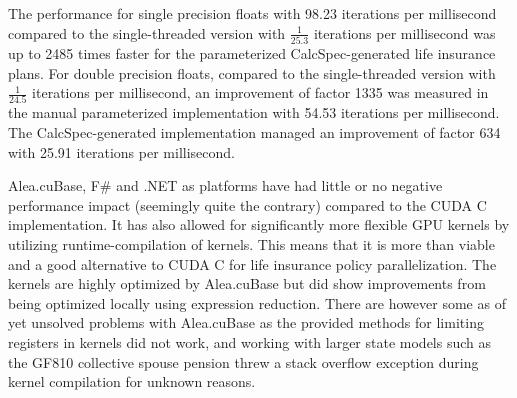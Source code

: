 The performance for single precision floats with 98.23 iterations per millisecond compared to the single-threaded version with $\frac{1}{25.3}$ iterations per millisecond was up to 2485 times faster for the parameterized CalcSpec-generated life insurance plans.
For double precision floats, compared to the single-threaded version with $\frac{1}{24.5}$ iterations per millisecond, an improvement of factor 1335 was measured in the manual parameterized implementation with 54.53 iterations per millisecond. 
The CalcSpec-generated implementation managed an improvement of factor 634 with 25.91 iterations per millisecond.

Alea.cuBase, F\# and .NET as platforms have had little or no negative performance impact (seemingly quite the contrary) compared to the CUDA C implementation.
It has also allowed for significantly more flexible GPU kernels by utilizing runtime-compilation of kernels.
This means that it is more than viable and a good alternative to CUDA C for life insurance policy parallelization.
The kernels are highly optimized by Alea.cuBase but did show improvements from being optimized locally using expression reduction.
There are however some as of yet unsolved problems with Alea.cuBase as the provided methods for limiting registers in kernels did not work, and working with larger state models such as the GF810 collective spouse pension threw a stack overflow exception during kernel compilation for unknown reasons.

\clearpage